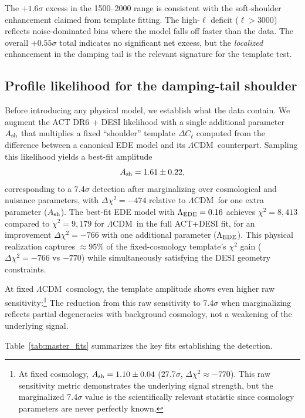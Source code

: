 \documentclass[twocolumn,showpacs,preprintnumbers,amsmath,amssymb,prd]{revtex4-2}
\newcommand{\lcdm}{$\Lambda$CDM}
\begin{document}
The $+1.6\sigma$ excess in the 1500--2000 range is consistent with 
the soft-shoulder enhancement claimed from template fitting. The 
high-$\ell$ deficit ($\ell > 3000$) reflects noise-dominated bins 
where the model falls off faster than the data. The overall 
$+0.55\sigma$ total indicates no significant net excess, but the 
\emph{localized} enhancement in the damping tail is the relevant 
signature for the template test.

\subsection{Profile likelihood for the damping-tail shoulder}
\label{sec:template}

Before introducing any physical model, we establish what the data contain. 
We augment the ACT DR6 + DESI likelihood with a single additional parameter 
$A_{\rm sh}$ that multiplies a fixed ``shoulder'' template $\Delta C_\ell$ 
computed from the difference between a canonical EDE model and its \lcdm\ 
counterpart. Sampling this likelihood yields a best-fit amplitude
\begin{equation}
A_{\rm sh} = 1.61 \pm 0.22,
\end{equation}
corresponding to a 7.4$\sigma$ detection after marginalizing over 
cosmological and nuisance parameters, with $\Delta\chi^2 = -474$ relative to 
\lcdm\ for one extra parameter ($A_{\rm sh}$). The best-fit EDE model with 
$\Lambda_{\rm EDE} = 0.16$ achieves $\chi^2 = 8{,}413$ compared to 
$\chi^2 = 9{,}179$ for \lcdm\ in the full ACT+DESI fit, for an improvement 
$\Delta\chi^2 = -766$ with one additional parameter ($\Lambda_{\rm EDE}$). 
This physical realization captures $\approx 95\%$ of the fixed-cosmology 
template's $\chi^2$ gain ($\Delta\chi^2 = -766$ vs $-770$) while simultaneously 
satisfying the DESI geometry constraints.

At fixed \lcdm\ cosmology, the template amplitude shows even higher raw 
sensitivity:\footnote{At fixed cosmology, $A_{\rm sh} = 1.10 \pm 0.04$ 
($27.7\sigma$, $\Delta\chi^2 \approx -770$). This raw sensitivity metric 
demonstrates the underlying signal strength, but the marginalized 7.4$\sigma$ 
value is the scientifically relevant statistic since cosmology parameters are 
never perfectly known.} The reduction from this raw sensitivity to 
7.4$\sigma$ when marginalizing reflects partial degeneracies with 
background cosmology, not a weakening of the underlying signal.

Table~\ref{tab:master_fits} summarizes the key fits establishing the detection.
\end{document}

